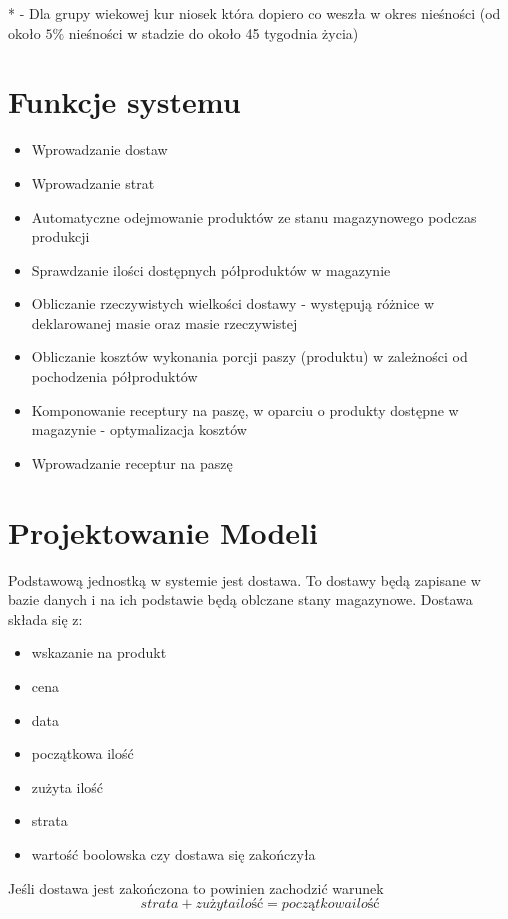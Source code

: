 \documentclass[shortabstract]{iithesis}
\begin{document}
	
	* - Dla grupy wiekowej kur niosek która dopiero co weszła w okres nieśności (od około $5\%$ nieśności w stadzie do około 45 tygodnia życia)
	


\chapter{Funkcje systemu}
	\begin{itemize}
  		\item  Wprowadzanie dostaw
  		\item  Wprowadzanie strat
  		\item  Automatyczne odejmowanie produktów ze stanu magazynowego podczas produkcji
  		\item  Sprawdzanie ilości dostępnych półproduktów w magazynie
  		\item  Obliczanie rzeczywistych wielkości dostawy - występują różnice w deklarowanej masie oraz masie rzeczywistej
  		\item  Obliczanie kosztów wykonania porcji paszy (produktu) w zależności od pochodzenia półproduktów
  		\item  Komponowanie receptury na paszę, w oparciu o produkty dostępne w magazynie - optymalizacja kosztów
  		\item  Wprowadzanie receptur na paszę
	\end{itemize} 


\chapter{Projektowanie Modeli}
Podstawową jednostką w systemie jest dostawa. To dostawy będą zapisane w bazie danych i na ich podstawie będą oblczane stany magazynowe.
Dostawa składa się z:
\begin{itemize}
	\item wskazanie na produkt
	\item cena
	\item data
	\item początkowa ilość
	\item zużyta ilość
	\item strata
	\item wartość boolowska czy dostawa się zakończyła
\end{itemize}

Jeśli dostawa jest zakończona to powinien zachodzić warunek $$strata + zużyta ilość = początkowa ilość$$
\end{document}
